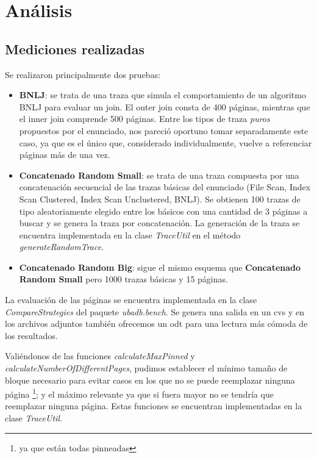 \section{An\'alisis}

\subsection{Mediciones realizadas}
Se realizaron principalmente dos pruebas:

\begin{itemize}
\item \textbf{BNLJ}: se trata de una traza que simula el comportamiento de un algoritmo BNLJ para evaluar un join. El outer join consta de 400 p\'aginas, mientras que el inner join comprende 500 p\'aginas. Entre los tipos de traza \textit{puros} propuestos por el enunciado, nos pareci\'o oportuno tomar separadamente este caso, ya que es el \'unico que, considerado individualmente, vuelve a referenciar p\'aginas m\'as de una vez. 
\item \textbf{Concatenado Random Small}: se trata de una traza compuesta por una concatenaci\'on secuencial de las trazas b\'asicas del enunciado (File Scan, Index Scan Clustered, Index Scan Unclustered, BNLJ). Se obtienen 100 trazas de tipo aleatoriamente elegido entre los b\'asicos con una cantidad de 3 p\'aginas a buscar y se genera la traza por concatenaci\'on. La generaci\'on de la traza se encuentra implementada en la clase \textit{TraceUtil} en el m\'etodo \textit{generateRandomTrace}.
\item \textbf{Concatenado Random Big}: sigue el mismo esquema que \textbf{Concatenado Random Small} pero 1000 trazas b\'asicas y 15 p\'aginas.


\end{itemize}

La evaluaci\'on de las p\'aginas se encuentra implementada en la clase \textit{CompareStrategies} del paquete \textit{ubadb.bench}. Se genera una salida en un cvs y en los archivos adjuntos tambi\'en ofrecemos un odt para una lectura m\'as c\'omoda de los resultados.

Vali\'endonos de las funciones \textit{calculateMaxPinned} y \textit{calculateNumberOfDifferentPages}, pudimos establecer el m\'inimo tama\~no de bloque necesario para evitar casos en los que no se puede reemplazar ninguna p\'agina \footnote{ya que est\'an todas pinneadas}; y el m\'aximo relevante ya que si fuera mayor no se tendr\'ia que reemplazar ninguna p\'agina. Estas funciones se encuentran implementadas en la clase \textit{TraceUtil}.

